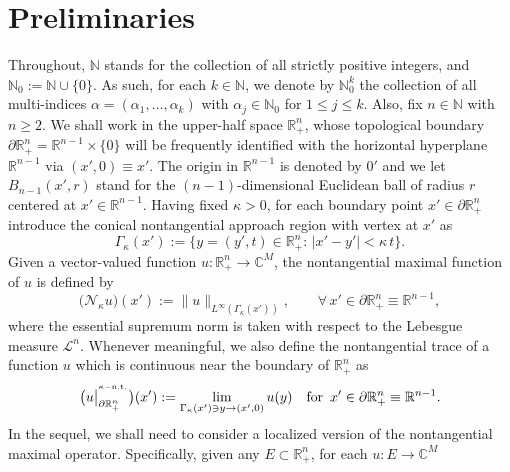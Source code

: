 \documentclass[11pt,reqno]{amsart}
\numberwithin{equation}{section}
\theoremstyle{remark}
\begin{document}
\section{Preliminaries}
\setcounter{equation}{0}
\label{S-2}

Throughout, ${\mathbb{N}}$ stands for the collection of all strictly positive
integers, and ${\mathbb{N}}_0:={\mathbb{N}}\cup\{0\}$. As such, for each $k\in\mathbb{N}$,
we denote by $\mathbb{N}_0^k$ the collection of all multi-indices $\alpha=(\alpha_1,\dots,\alpha_k)$
with $\alpha_j\in\mathbb{N}_0$ for $1\leq j\leq k$. Also, fix $n\in{\mathbb{N}}$ with $n\geq 2$.
We shall work in the upper-half space ${\mathbb{R}}^{n}_{+}$, whose topological boundary 
$\partial{\mathbb{R}}^{n}_{+}={\mathbb{R}}^{n-1}\times\{0\}$ will be frequently identified 
with the horizontal hyperplane ${\mathbb{R}}^{n-1}$ via $(x',0)\equiv x'$. 
The origin in ${\mathbb{R}}^{n-1}$ is denoted by $0'$
and we let $B_{n-1}(x',r)$ stand for the $(n-1)$-dimensional Euclidean ball of radius $r$
centered at $x'\in{\mathbb{R}}^{n-1}$. Having fixed $\kappa>0$, for each boundary point
$x'\in\partial{\mathbb{R}}^{n}_{+}$ introduce the conical nontangential approach region
with vertex at $x'$ as
%
\begin{equation}\label{NT-1}
\Gamma_\kappa(x'):=\big\{y=(y',t)\in{\mathbb{R}}^{n}_{+}:\,|x'-y'|<\kappa\,t\big\}.
\end{equation}
%
Given a vector-valued function $u:{\mathbb{R}}^{n}_{+}\to{\mathbb{C}}^M$,
the nontangential maximal function of $u$ is defined by
%
\begin{equation}\label{NT-Fct}
\big({\mathcal{N}}_\kappa u\big)(x'):=\|u\|_{L^\infty(\Gamma_\kappa(x'))},\qquad
\forall\,x'\in\partial{\mathbb{R}}^{n}_{+}\equiv{\mathbb{R}}^{n-1}, 
\end{equation}
%
where the essential supremum norm is taken with respect to the Lebesgue measure ${\mathscr{L}}^n$. 
Whenever meaningful, we also define the nontangential trace of a function $u$ which is continuous near 
the boundary of ${\mathbb{R}}^n_{+}$ as 
%
\begin{equation}\label{nkc-EE-2}
\big(u\big|^{{}^{\kappa-{\rm n.t.}}}_{\partial{\mathbb{R}}^{n}_{+}}\big)(x')
:=\lim_{\Gamma_{\kappa}(x')\ni y\to (x',0)}u(y)
\quad\text{for }\,x'\in\partial{\mathbb{R}}^{n}_{+}\equiv{\mathbb{R}}^{n-1}.
\end{equation}
%
In the sequel, we shall need to consider a localized version of the
nontangential maximal operator. Specifically, given any
$E\subset{\mathbb{R}}^n_{+}$, for each $u:E\to{\mathbb{C}}^M$
\end{document}
